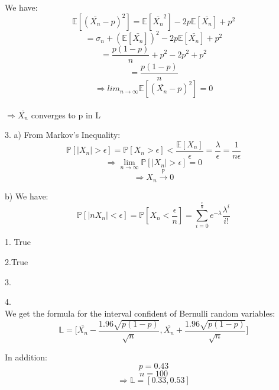 \documentclass[10pt]{article}
\newenvironment{problem}[2][Problem]{\begin{trivlist}
\item[\hskip \labelsep {\bfseries #1}\hskip \labelsep {\bfseries #2.}]}{\end{trivlist}}
\begin{document}
\begin{problem}{1}
We have:\\
\[\mathbb{E}[(\bar{X_n}-p)^2]= \mathbb{E}[\bar{X_n}^2]-2p\mathbb{E}[\bar{X_n}]+ p^2\]
\[=\sigma_n+ (\mathbb{E}[\bar{X_n}])^2-2p\mathbb{E}[\bar{X_n}]+ p^2\]
\[=\frac{p(1-p)}{n}+p^2-2p^2+ p^2\]
\[=\frac{p(1-p)}{n}\]
\[\Rightarrow lim_{n \rightarrow \infty} \mathbb{E}[(\bar{X_n}-p)^2]=0\]\\

$\Rightarrow \bar{X_n}$ converges to p in L 


\item 3.
a) From Markov's Inequality: \\
\[\mathbb{P}[|X_n|> \epsilon]= \mathbb{P}[X_n>\epsilon] < \frac{\mathbb{E}[X_n]}{\epsilon}=\frac{\lambda}{\epsilon}= \frac{1}{n\epsilon}\]
\[\Rightarrow \lim_{n \rightarrow \infty} \mathbb{P}[|X_n| > \epsilon]=0\]
\[ \Rightarrow X_n \xrightarrow{\mathbb{P}}0\]

b) We have: \\
\[\mathbb{P}[|nX_n|< \epsilon]= \mathbb{P}[X_n<\frac{\epsilon}{n}]=\sum_{i=0}^{\frac{\epsilon}{n}}e^{-\lambda}\frac{\lambda^i}{i!}\] 







\end{problem}

\begin{problem}{2}
\item 1. True \\
\item 2.True \\
\item 3.
\item 4.\\

We get the formula for the interval confident of Bernulli random variables:\\
\[\mathbb{L}=\Big[\bar{X_n}- \frac{1.96\sqrt{p(1-p)}}{\sqrt{n}},\bar{X_n}+ \frac{1.96\sqrt{p(1-p)}}{\sqrt{n}} \Big]\]

In addition:\\
\[p=0.43\]
\[n=100\]
\[\Rightarrow \mathbb{L}=[0.33,0.53]\]

\end{problem}
\end{document}
